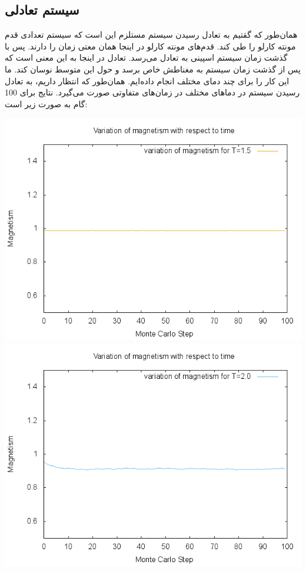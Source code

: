 \documentclass[a4paper,12pt]{article}
\begin{document}
\subsection{سیستم تعادلی}
همان‌طور که گقتیم به تعادل رسیدن سیستم مستلزم
این است که سیستم تعدادی قدم مونته کارلو را طی کند.
قدم‌های مونته کارلو در اینجا همان معتی زمان را دارند.
پس با گذشت زمان سیستم اسپینی به تعادل می‌رسد.
تعادل در اینجا به این معنی است که پس از گذشت زمان سیستم
به مغناطش خاص برسد و حول این متوسط نوسان کند.
ما این کار را برای چند دمای مختلف انجام داده‌ایم.
همان‌طور که  انتظار داریم، به تعادل رسیدن سیستم در دماهای مختلف
در زمان‌های متفاوتی صورت می‌گیرد. نتایج برای 100 گام به صورت زیر است:
\begin{center}
 \includegraphics[scale=.8]{15.png}
\includegraphics[scale=.8]{20.png}

\end{center}
\end{document}
